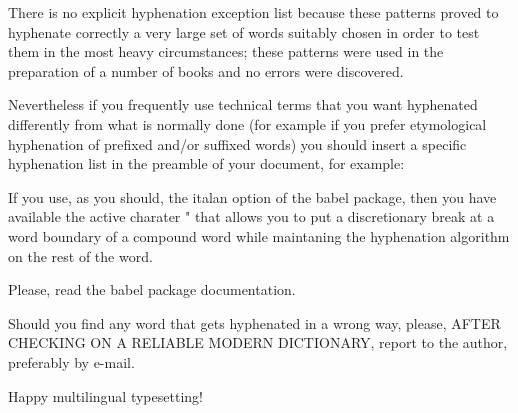 There is no explicit  hyphenation  exception  list  because  these  patterns
proved  to  hyphenate correctly a very large set of words suitably chosen in
order to test them in the most heavy circumstances; these patterns were used
in the preparation of a number of books and no errors were discovered.

Nevertheless if you frequently use  technical terms that you want hyphenated
differently  from  what  is  normally  done  (for  example  if  you   prefer
etymological  hyphenation  of  prefixed  and/or  suffixed  words) you should
insert a specific hyphenation  list  in  the  preamble of your document, for
example:


If you use, as you should, the italan  option of the babel package, then you 
have available the active charater "  that allows you to put a discretionary 
break at a word boundary of a compound word while maintaning the hyphenation 
algorithm on the rest of the word. 

Please, read the babel package documentation.

Should you find any word that gets hyphenated in a wrong way, please, AFTER
CHECKING ON A RELIABLE MODERN DICTIONARY, report to the author, preferably
by e-mail.


                       Happy multilingual typesetting!

